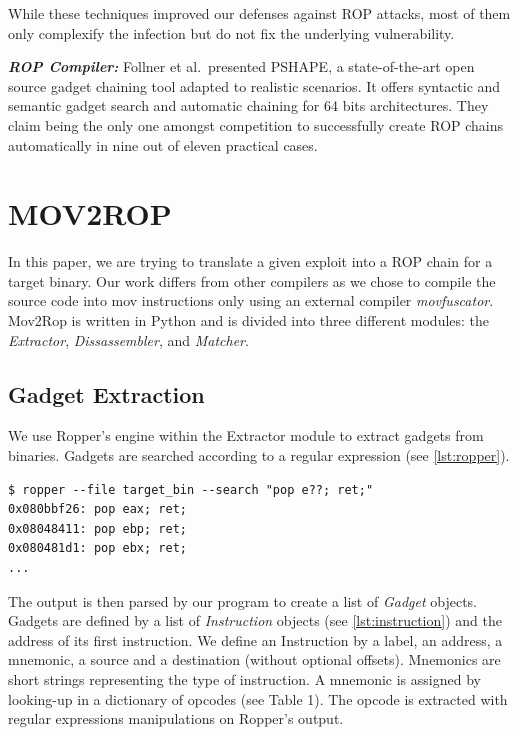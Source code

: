 \documentclass[10pt,twocolumn]{article}
\begin{document}
While these techniques improved our defenses against ROP attacks, most of them only
 complexify the infection but do not fix the underlying vulnerability.

\textbf{\textit{ROP Compiler:}} Follner et al.\ presented
PSHAPE\cite{barthe_pshape:_2016}, a state-of-the-art open source gadget
chaining tool adapted to realistic scenarios. It offers syntactic and semantic
gadget search and automatic chaining for 64 bits architectures.  They claim
being the only one amongst competition to successfully create ROP chains
automatically in nine out of eleven practical cases.


\section{MOV2ROP}

In this paper, we are trying to translate a given exploit into a ROP chain for
a target binary. Our work differs from other compilers as we chose to compile
the source code into mov instructions only using an external compiler
\textit{movfuscator}. Mov2Rop is written in Python and is divided into three
different modules: the \textit{Extractor}, \textit{Dissassembler}, and
\textit{Matcher}.

\subsection{Gadget Extraction}

We use Ropper's engine\cite{sashs_ropper} within the Extractor  module to
extract gadgets from binaries. Gadgets are searched according to a regular
expression (see \autoref{lst:ropper}).

\begin{lstlisting}[float=h,aboveskip=\medskipamount,belowskip=0pt,caption=Ropper
search engine,label=lst:ropper]
$ ropper --file target_bin --search "pop e??; ret;"
0x080bbf26: pop eax; ret;
0x08048411: pop ebp; ret;
0x080481d1: pop ebx; ret;
...
\end{lstlisting}

The output is then parsed by our program to create a list of \textit{Gadget}
objects. Gadgets are defined by a list of \textit{Instruction} objects (see
\autoref{lst:instruction}) and the
address of its first instruction. We define an Instruction by a label, an
address, a mnemonic, a source and a destination (without optional offsets).
Mnemonics are short strings representing the type of instruction. A mnemonic is
assigned by looking-up in a dictionary of opcodes (see Table 1). The opcode is extracted
with regular expressions manipulations on Ropper's output.
\end{document}
